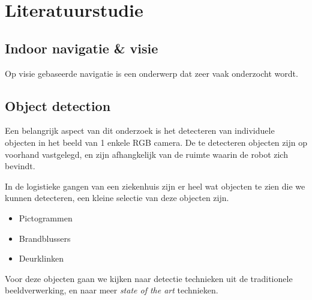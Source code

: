 
\chapter{Literatuurstudie}

\section{Indoor navigatie \& visie}
        Op visie gebaseerde navigatie is een onderwerp dat zeer vaak onderzocht wordt.
        
    \section{Object detection}

        Een belangrijk aspect van dit onderzoek is het detecteren van individuele objecten in het beeld van 1 enkele RGB camera.
        De te detecteren objecten zijn op voorhand vastgelegd, en zijn afhangkelijk van de ruimte waarin de robot zich bevindt.

        In de logistieke gangen van een ziekenhuis zijn er heel wat objecten te zien die we kunnen detecteren, een kleine selectie van deze objecten zijn.

        \begin{itemize}
            \item Pictogrammen
            \item Brandblussers
            \item Deurklinken
        \end{itemize}

        Voor deze objecten gaan we kijken naar detectie technieken uit de traditionele beeldverwerking, en naar meer \textit{state of the art} technieken. 


